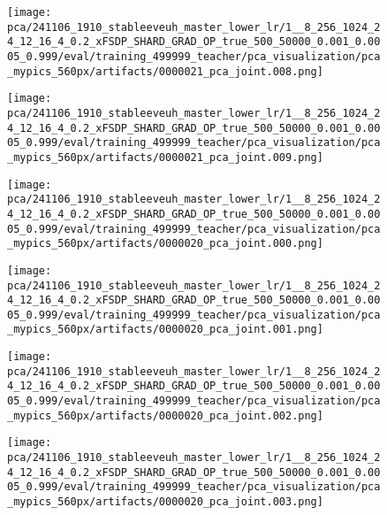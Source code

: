 \begin{figure*}[p]
\begin{subfigure}[t]{0.097\textwidth}
    \end{subfigure}\hfill
    \begin{subfigure}[t]{0.097\textwidth}
        \centering
        \texttt{[image: pca/241106\_1910\_stableeveuh\_master\_lower\_lr/1\_\_8\_256\_1024\_24\_12\_16\_4\_0.2\_xFSDP\_SHARD\_GRAD\_OP\_true\_500\_50000\_0.001\_0.0005\_0.999/eval/training\_499999\_teacher/pca\_visualization/pca\_mypics\_560px/artifacts/0000021\_pca\_joint.008.png]}
    \end{subfigure}\hfill
    \begin{subfigure}[t]{0.097\textwidth}
        \centering
        \texttt{[image: pca/241106\_1910\_stableeveuh\_master\_lower\_lr/1\_\_8\_256\_1024\_24\_12\_16\_4\_0.2\_xFSDP\_SHARD\_GRAD\_OP\_true\_500\_50000\_0.001\_0.0005\_0.999/eval/training\_499999\_teacher/pca\_visualization/pca\_mypics\_560px/artifacts/0000021\_pca\_joint.009.png]}
    \end{subfigure}
    \begin{subfigure}[t]{0.097\textwidth}
        \centering
        \texttt{[image: pca/241106\_1910\_stableeveuh\_master\_lower\_lr/1\_\_8\_256\_1024\_24\_12\_16\_4\_0.2\_xFSDP\_SHARD\_GRAD\_OP\_true\_500\_50000\_0.001\_0.0005\_0.999/eval/training\_499999\_teacher/pca\_visualization/pca\_mypics\_560px/artifacts/0000020\_pca\_joint.000.png]}
    \end{subfigure}\hfill
    \begin{subfigure}[t]{0.097\textwidth}
        \centering
        \texttt{[image: pca/241106\_1910\_stableeveuh\_master\_lower\_lr/1\_\_8\_256\_1024\_24\_12\_16\_4\_0.2\_xFSDP\_SHARD\_GRAD\_OP\_true\_500\_50000\_0.001\_0.0005\_0.999/eval/training\_499999\_teacher/pca\_visualization/pca\_mypics\_560px/artifacts/0000020\_pca\_joint.001.png]}
    \end{subfigure}\hfill
    \begin{subfigure}[t]{0.097\textwidth}
        \centering
        \texttt{[image: pca/241106\_1910\_stableeveuh\_master\_lower\_lr/1\_\_8\_256\_1024\_24\_12\_16\_4\_0.2\_xFSDP\_SHARD\_GRAD\_OP\_true\_500\_50000\_0.001\_0.0005\_0.999/eval/training\_499999\_teacher/pca\_visualization/pca\_mypics\_560px/artifacts/0000020\_pca\_joint.002.png]}
    \end{subfigure}\hfill
    \begin{subfigure}[t]{0.097\textwidth}
        \centering
        \texttt{[image: pca/241106\_1910\_stableeveuh\_master\_lower\_lr/1\_\_8\_256\_1024\_24\_12\_16\_4\_0.2\_xFSDP\_SHARD\_GRAD\_OP\_true\_500\_50000\_0.001\_0.0005\_0.999/eval/training\_499999\_teacher/pca\_visualization/pca\_mypics\_560px/artifacts/0000020\_pca\_joint.003.png]}

\end{subfigure}
\end{figure*}
